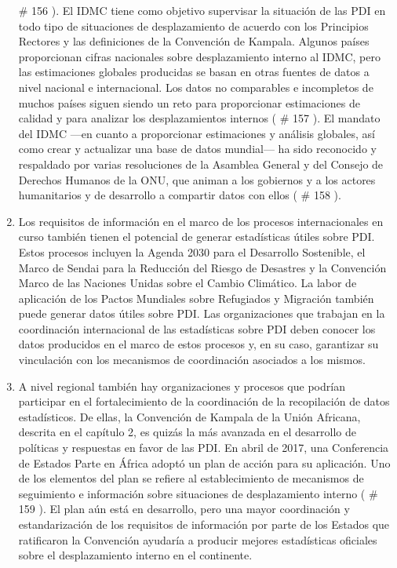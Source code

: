 \documentclass[
]{book}
\begin{document}
\begin{enumerate}
  \# 156
  ). El IDMC tiene como objetivo supervisar la situación de las PDI en todo tipo de situaciones de desplazamiento de acuerdo con los Principios Rectores y las definiciones de la Convención de Kampala. Algunos países proporcionan cifras nacionales sobre desplazamiento interno al IDMC, pero las estimaciones globales producidas se basan en otras fuentes de datos a nivel nacional e internacional. Los datos no comparables e incompletos de muchos países siguen siendo un reto para proporcionar estimaciones de calidad y para analizar los desplazamientos internos (
  \# 157
  ). El mandato del IDMC ---en cuanto a proporcionar estimaciones y análisis globales, así como crear y actualizar una base de datos mundial--- ha sido reconocido y respaldado por varias resoluciones de la Asamblea General y del Consejo de Derechos Humanos de la ONU, que animan a los gobiernos y a los actores humanitarios y de desarrollo a compartir datos con ellos (
  \# 158
  ).
\item
  Los requisitos de información en el marco de los procesos internacionales en curso también tienen el potencial de generar estadísticas útiles sobre PDI. Estos procesos incluyen la Agenda 2030 para el Desarrollo Sostenible, el Marco de Sendai para la Reducción del Riesgo de Desastres y la Convención Marco de las Naciones Unidas sobre el Cambio Climático. La labor de aplicación de los Pactos Mundiales sobre Refugiados y Migración también puede generar datos útiles sobre PDI. Las organizaciones que trabajan en la coordinación internacional de las estadísticas sobre PDI deben conocer los datos producidos en el marco de estos procesos y, en su caso, garantizar su vinculación con los mecanismos de coordinación asociados a los mismos.
\item
  A nivel regional también hay organizaciones y procesos que podrían participar en el fortalecimiento de la coordinación de la recopilación de datos estadísticos. De ellas, la Convención de Kampala de la Unión Africana, descrita en el capítulo 2, es quizás la más avanzada en el desarrollo de políticas y respuestas en favor de las PDI. En abril de 2017, una Conferencia de Estados Parte en África adoptó un plan de acción para su aplicación. Uno de los elementos del plan se refiere al establecimiento de mecanismos de seguimiento e información sobre situaciones de desplazamiento interno (
  \# 159
  ). El plan aún está en desarrollo, pero una mayor coordinación y estandarización de los requisitos de información por parte de los Estados que ratificaron la Convención ayudaría a producir mejores estadísticas oficiales sobre el desplazamiento interno en el continente.

\end{enumerate}
\end{document}
